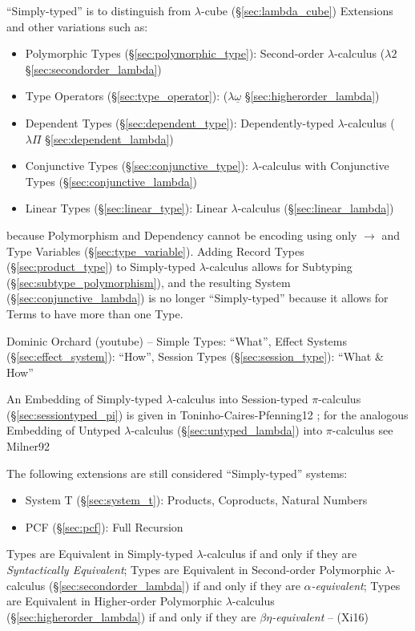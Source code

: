 ``Simply-typed'' is to distinguish from $\lambda$-cube
(\S\ref{sec:lambda_cube}) Extensions and other variations such as:
\begin{itemize}
  \item Polymorphic Types (\S\ref{sec:polymorphic_type}): Second-order
    $\lambda$-calculus ($\lambda2$ \S\ref{sec:secondorder_lambda})
  \item Type Operators (\S\ref{sec:type_operator}):
    ($\lambda\underline{\omega}$ \S\ref{sec:higherorder_lambda})
  \item Dependent Types (\S\ref{sec:dependent_type}):
    Dependently-typed $\lambda$-calculus ($\lambda\Pi$
    \S\ref{sec:dependent_lambda})
  \item Conjunctive Types (\S\ref{sec:conjunctive_type}):
    $\lambda$-calculus with Conjunctive Types
    (\S\ref{sec:conjunctive_lambda})
  \item Linear Types (\S\ref{sec:linear_type}): Linear
    $\lambda$-calculus (\S\ref{sec:linear_lambda})
\end{itemize}
because Polymorphism and Dependency cannot be encoding using only
$\rightarrow$ and Type Variables (\S\ref{sec:type_variable}). Adding
Record Types (\S\ref{sec:product_type}) to Simply-typed
$\lambda$-calculus allows for Subtyping
(\S\ref{sec:subtype_polymorphism}), and the resulting System
(\S\ref{sec:conjunctive_lambda}) is no longer ``Simply-typed'' because
it allows for Terms to have more than one Type.

Dominic Orchard (youtube) -- Simple Types: ``What'', Effect Systems
(\S\ref{sec:effect_system}): ``How'', Session Types
(\S\ref{sec:session_type}): ``What \& How''

\fist An Embedding of Simply-typed $\lambda$-calculus into
Session-typed $\pi$-calculus (\S\ref{sec:sessiontyped_pi}) is given in
Toninho-Caires-Pfenning12 \cite{caires-pfenning-toninho12}; for the
analogous Embedding of Untyped $\lambda$-calculus
(\S\ref{sec:untyped_lambda}) into $\pi$-calculus see Milner92
\cite{milner92}

The following extensions are still considered ``Simply-typed''
systems:
\begin{itemize}
  \item System T (\S\ref{sec:system_t}): Products, Coproducts, Natural
    Numbers
  \item PCF (\S\ref{sec:pcf}): Full Recursion
\end{itemize}

Types are Equivalent in Simply-typed $\lambda$-calculus if and only if
they are \emph{Syntactically Equivalent}; Types are Equivalent in
Second-order Polymorphic $\lambda$-calculus
(\S\ref{sec:secondorder_lambda}) if and only if they are
\emph{$\alpha$-equivalent}; Types are Equivalent in Higher-order
Polymorphic $\lambda$-calculus (\S\ref{sec:higherorder_lambda}) if and
only if they are \emph{$\beta\eta$-equivalent} -- (Xi16)

